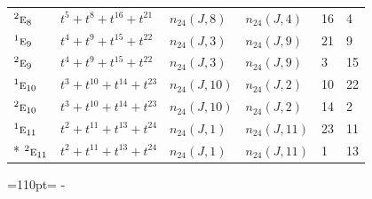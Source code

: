 \documentclass[10pt,a4paper]{article}
\newcommand{\needspace}[1]{\par\penalty-100\begingroup\dimen0=#1\relax\dimen2=\pagegoal
  \advance\dimen2-\pagetotal\ifdim\dimen0>\dimen2\relax\ifdim\dimen2>0pt\vfil\break\fi\fi
  \endgroup}
\numberwithin{equation}{section}
\newcommand{\irr}[1]{\text{\normalfont\scshape #1}}
\newcommand{\conjpair}[1]{{}^{#1}}
\begin{document}
{\begin{longtable}{@{}llllll@{}}
$\conjpair{2}\irr{e}_{8}$ & $t^{5} + t^{8} + t^{16} + t^{21}$ & $n_{24}(J,8)$ & $n_{24}(J,4)$ & 16 & 4\\
$\conjpair{1}\irr{e}_{9}$ & $t^{4} + t^{9} + t^{15} + t^{22}$ & $n_{24}(J,3)$ & $n_{24}(J,9)$ & 21 & 9\\
$\conjpair{2}\irr{e}_{9}$ & $t^{4} + t^{9} + t^{15} + t^{22}$ & $n_{24}(J,3)$ & $n_{24}(J,9)$ & 3 & 15\\
$\conjpair{1}\irr{e}_{10}$ & $t^{3} + t^{10} + t^{14} + t^{23}$ & $n_{24}(J,10)$ & $n_{24}(J,2)$ & 10 & 22\\
$\conjpair{2}\irr{e}_{10}$ & $t^{3} + t^{10} + t^{14} + t^{23}$ & $n_{24}(J,10)$ & $n_{24}(J,2)$ & 14 & 2\\
$\conjpair{1}\irr{e}_{11}$ & $t^{2} + t^{11} + t^{13} + t^{24}$ & $n_{24}(J,1)$ & $n_{24}(J,11)$ & 23 & 11\\*
$\conjpair{2}\irr{e}_{11}$ & $t^{2} + t^{11} + t^{13} + t^{24}$ & $n_{24}(J,1)$ & $n_{24}(J,11)$ & 1 & 13\\
\bottomrule\end{longtable}}
\needspace{110pt}
\end{document}
